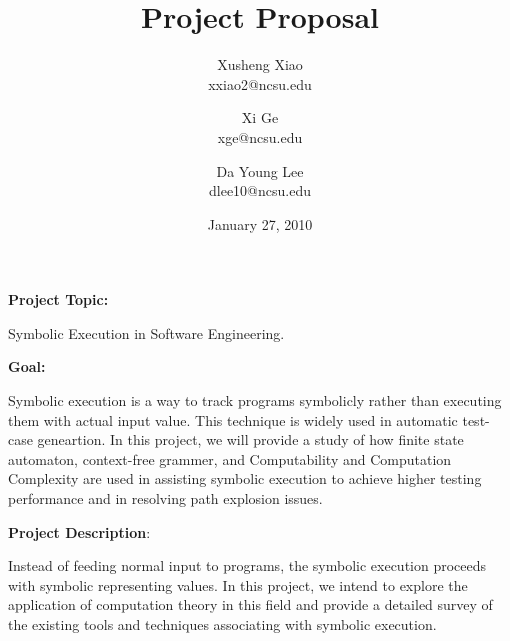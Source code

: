 \documentclass[times, 10pt,onecolumn]{article}
\title{Project Proposal}
\author{
Xusheng Xiao\\
\small{xxiao2@ncsu.edu}\\
\and
Xi Ge\\
\small{xge@ncsu.edu}\\
\and
Da Young Lee\\
\small{dlee10@ncsu.edu}
}
\date{January 27, 2010}
\begin{document}
\maketitle

\begin{flushleft}
\textbf{Project Topic:}\end{flushleft} Symbolic Execution in Software Engineering.\\

\begin{flushleft}
\textbf{Goal:}\end{flushleft}
Symbolic execution is a way to track programs symbolicly rather than executing them with actual input value. This technique is widely used in automatic test-case geneartion. In this project, we will provide a study of how finite state automaton, context-free grammer, and Computability and Computation Complexity are used in assisting symbolic execution to achieve higher testing performance and in resolving path explosion issues. 
\\

\begin{flushleft}
\textbf{Project Description}:\end{flushleft}
Instead of feeding normal input to programs, the symbolic execution proceeds with symbolic representing values\cite{symbolic}. In this project, we intend to explore the application of computation theory in this field and provide a detailed survey of the existing tools and techniques associating with symbolic execution. 
\end{document}
